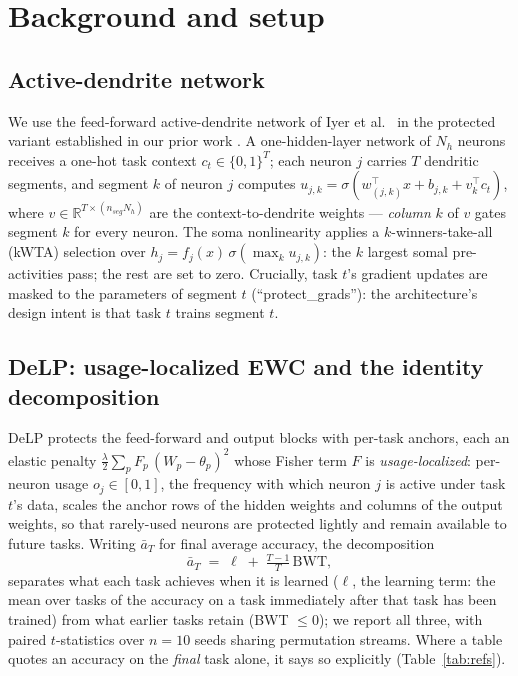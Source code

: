 \documentclass[review,12pt,number]{elsarticle}
\newcommand{\delp}{DeLP}
\begin{document}
\section{Background and setup}
\label{sec:setup}

\subsection{Active-dendrite network}
\label{sec:adnet}

\label{sec:adnet}

We use the feed-forward active-dendrite network of Iyer et al.\
\cite{iyer2022} in the protected variant established in our prior work
\cite{zhou2026delp}. A one-hidden-layer network of $N_h$ neurons receives a
one-hot task context $c_t \in \{0,1\}^{T}$; each neuron $j$ carries $T$
dendritic segments, and segment $k$ of neuron $j$ computes
$u_{j,k} = \sigma(w_{(j,k)}^\top x + b_{j,k} + v_{k}^\top c_t)$, where
$v \in \mathbb{R}^{T \times (n_{seg} N_h)}$ are the context-to-dendrite
weights --- \emph{column} $k$ of $v$ gates segment $k$ for every neuron.
The soma nonlinearity applies a $k$-winners-take-all (kWTA) selection over
$h_j = f_j(x)\, \sigma(\max_k u_{j,k})$: the $k$ largest somal pre-activities
pass; the rest are set to zero. Crucially, task $t$'s gradient updates are
masked to the parameters of segment $t$ (``protect\_grads''): the
architecture's design intent is that task $t$ trains segment $t$.

\subsection{\delp{}: usage-localized EWC and the identity decomposition}
\label{sec:delp}

\label{sec:delp}

\delp{} \cite{zhou2026delp} protects the feed-forward and output blocks with
per-task anchors, each an elastic penalty
$\frac{\lambda}{2}\sum_p F_p\, (W_p - \theta_p)^2$ whose Fisher term $F$ is
\emph{usage-localized}: per-neuron usage $o_j \in [0,1]$, the frequency with
which neuron $j$ is active under task $t$'s data, scales the anchor rows of
the hidden weights and columns of the output weights, so that rarely-used
neurons are protected lightly and remain available to future tasks. Writing
$\bar a_T$ for final average accuracy, the decomposition
\begin{equation}
\bar a_T \;=\; \ell \;+\; \tfrac{T-1}{T}\,\mathrm{BWT},
\label{eq:identity}
\end{equation}
separates what each task achieves when it is learned ($\ell$, the learning
term: the mean over tasks of the accuracy on a task immediately after that
task has been trained) from what earlier tasks retain (BWT $\le 0$); we
report all three, with paired $t$-statistics over $n{=}10$ seeds sharing
permutation streams. Where a table quotes an accuracy on the \emph{final}
task alone, it says so explicitly (Table~\ref{tab:refs}).
\end{document}
